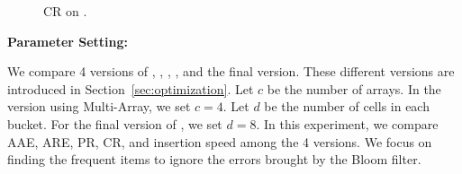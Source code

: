 \begin{figure*}[!ht]
	\centering

			
				\caption{CR on \taskpara.}
				\label{str_cr}
				
			\end{figure*}
			
\noindent\textbf{Parameter Setting:}
%
%

We compare 4 versions of \sketchname, \secmin, \secss, \secarr, and the final version. These different versions are introduced in Section~\ref{sec:optimization}.
Let $c$ be the number of arrays. In the version using Multi-Array, we set $c=4$.
Let $d$ be the number of cells in each bucket. For the final version of \sketchname, we set $d=8$.
In this experiment, we compare AAE, ARE, PR, CR, and insertion speed among the 4 versions.
We focus on finding the frequent items to ignore the errors brought by the Bloom filter.   

